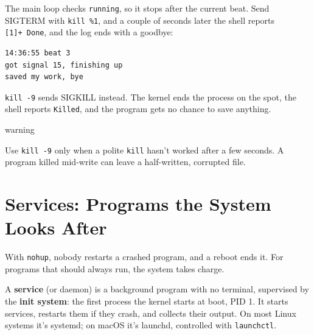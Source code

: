 
The main loop checks \texttt{running}, so it stops after the current beat. Send SIGTERM with \texttt{kill\ \%1}, and a couple of seconds later the shell reports \texttt{{[}1{]}+\ Done}, and the log ends with a goodbye:

\begin{codeblock}

\begin{Shaded}
\begin{Highlighting}[]
 
\end{Highlighting}
\end{Shaded}

\end{codeblock}

\begin{codeblock}
\begin{Verbatim}[formatcom=\outputstyle]
14:36:55 beat 3
got signal 15, finishing up
saved my work, bye
\end{Verbatim}
\end{codeblock}

\texttt{kill\ -9} sends SIGKILL instead. The kernel ends the process on the spot, the shell reports \texttt{Killed}, and the program gets no chance to save anything.

\begin{callout}{warning}

Use \texttt{kill\ -9} only when a polite \texttt{kill} hasn't worked after a few seconds. A program killed mid-write can leave a half-written, corrupted file.

\end{callout}

\section{Services: Programs the System Looks After}\label{06-programs-that-keep-running:services-programs-the-system-looks-after}

With \texttt{nohup}, nobody restarts a crashed program, and a reboot ends it. For programs that should always run, the system takes charge.

A \textbf{service} (or daemon) is a background program with no terminal, supervised by the \textbf{init system}: the first process the kernel starts at boot, PID 1. It starts services, restarts them if they crash, and collects their output. On most Linux systems it's systemd; on macOS it's launchd, controlled with \texttt{launchctl}.

